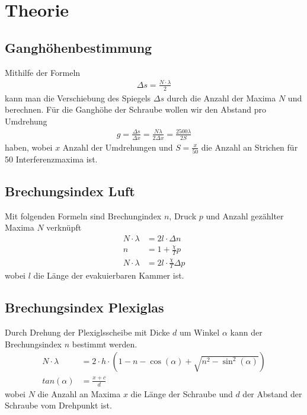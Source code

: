 \documentclass[11pt, a4paper]{article}
\begin{document}
    \section{Theorie}
    \subsection{Ganghöhenbestimmung} \label{sec:gang}

    Mithilfe der Formeln
    \begin{align}
        \Delta s = \frac{N \cdot \lambda}{2}
    \end{align}
    kann man die Verschiebung des Spiegels $\Delta s$ durch die Anzahl der Maxima $N$ und berechnen. Für die Ganghöhe der Schraube wollen wir den Abstand pro Umdrehung
    \begin{align}
        g = \frac{\Delta s}{\Delta x} = \frac{N \lambda}{2 \Delta x} = \frac{2500 \lambda}{2 S} \label{eq:gang}
    \end{align}
    haben, wobei $x$ Anzahl der Umdrehungen und $S = \frac{x}{50}$ die Anzahl an Strichen für 50 Interferenzmaxima ist. 

    \subsection{Brechungsindex Luft}
    Mit folgenden Formeln sind Brechungindex $n$, Druck $p$ und Anzahl gezählter Maxima $N$ verknüpft
    \begin{align}
        N \cdot \lambda &= 2 l \cdot \Delta n \label{eq:n}\\
        n &= 1 + \frac{\chi}{T} p \label{eq:luft} \\ 
        N \cdot \lambda &= 2 l \cdot \frac{\chi}{T} \Delta p
    \end{align}
    wobei $l$ die Länge der evakuierbaren Kammer ist.

    \subsection{Brechungsindex Plexiglas}
    Durch Drehung der Plexiglsscheibe mit Dicke $d$ um Winkel $\alpha$ kann der Brechungsindex $n$ bestimmt werden.
    \begin{align}
        N \cdot \lambda &= 2 \cdot h \cdot \left(1 - n - \cos(\alpha) + \sqrt{n^2 - \sin^2(\alpha)}\right)\label{fitplex} \\
        tan(\alpha) &= \frac{x + c}{d} \label{Winkelum}
    \end{align}
    wobei $N$ die Anzahl an Maxima $x$ die Länge der Schraube und $d$ der Abstand der Schraube vom Drehpunkt ist.
\end{document}
